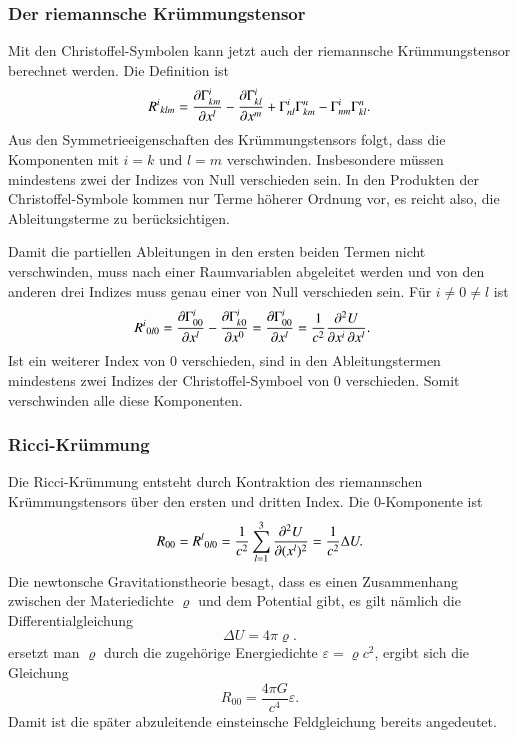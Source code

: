 %
%
\subsubsection{Der riemannsche Krümmungstensor}
Mit den Christoffel-Symbolen kann jetzt auch der riemannsche Krümmungstensor
berechnet werden.
Die Definition ist
\begin{equation}
R^{i}\mathstrut_{klm}
=
\frac{\partial \Gamma^i_{km}}{\partial x^l}
-
\frac{\partial \Gamma^i_{kl}}{\partial x^m}
+
\Gamma^i_{nl}
\Gamma^n_{km}
-
\Gamma^i_{nm}
\Gamma^n_{kl}.
\end{equation}
Aus den Symmetrieeigenschaften des Krümmungstensors folgt, dass die
Komponenten mit $i=k$ und $l=m$ verschwinden.
Insbesondere müssen mindestens zwei der Indizes von Null verschieden sein.
In den Produkten der Christoffel-Symbole kommen nur Terme höherer Ordnung
vor, es reicht also, die Ableitungsterme zu berücksichtigen.

Damit die partiellen Ableitungen in den ersten beiden Termen nicht
verschwinden, muss nach einer Raumvariablen abgeleitet werden und von
den anderen drei Indizes muss genau einer von Null verschieden sein.
Für $i\ne 0\ne l$ ist
\begin{align}
R^i\mathstrut_{0l0}
&=
\frac{\partial \Gamma^i_{00}}{\partial x^l}
-
\frac{\partial \Gamma^i_{k0}}{\partial x^0}
=
\frac{\partial \Gamma^i_{00}}{\partial x^l}
=
\frac{1}{c^2}
\frac{\partial^2 U}{\partial x^i\,\partial x^l}.
\label{buch:kruemmung:newton:eqn:riemann}
\end{align}
Ist ein weiterer Index von 0 verschieden, sind in den Ableitungstermen
mindestens zwei Indizes der Christoffel-Symboel von 0 verschieden.
Somit verschwinden alle diese Komponenten.

%
%
\subsubsection{Ricci-Krümmung}
Die Ricci-Krümmung entsteht durch Kontraktion des riemannschen
Krümmungstensors über den ersten und dritten Index.
Die 0-Komponente ist
\[
R_{00}
=
R^l\mathstrut_{0l0}
=
\frac{1}{c^2}
\sum_{l=1}^3
\frac{\partial^2 U}{\partial (x^l)^2}
=
\frac{1}{c^2}\Delta U.
\]
Die newtonsche Gravitationstheorie besagt, dass es einen Zusammenhang
zwischen der Materiedichte $\varrho$ und dem Potential gibt, es gilt
nämlich die Differentialgleichung
\begin{equation}
\Delta U = 4\pi \varrho.
\label{buch:kruemmung:newton:potential}
\end{equation}
ersetzt man $\varrho$ durch die zugehörige Energiedichte
$\varepsilon = \varrho c^2$, ergibt sich die Gleichung
\[
R_{00}
=
\frac{4\pi G}{c^4}\varepsilon.
\]
Damit ist die später abzuleitende einsteinsche Feldgleichung bereits
angedeutet.

